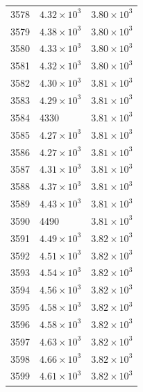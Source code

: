 \begin{table}[H]
\begin{tabular}{lll}
3578 & $\displaystyle 4.32 \times 10^{3}$ & $\displaystyle 3.80 \times 10^{3}$ \\
3579 & $\displaystyle 4.38 \times 10^{3}$ & $\displaystyle 3.80 \times 10^{3}$ \\
3580 & $\displaystyle 4.33 \times 10^{3}$ & $\displaystyle 3.80 \times 10^{3}$ \\
3581 & $\displaystyle 4.32 \times 10^{3}$ & $\displaystyle 3.80 \times 10^{3}$ \\
3582 & $\displaystyle 4.30 \times 10^{3}$ & $\displaystyle 3.81 \times 10^{3}$ \\
3583 & $\displaystyle 4.29 \times 10^{3}$ & $\displaystyle 3.81 \times 10^{3}$ \\
3584 & 4330 & $\displaystyle 3.81 \times 10^{3}$ \\
3585 & $\displaystyle 4.27 \times 10^{3}$ & $\displaystyle 3.81 \times 10^{3}$ \\
3586 & $\displaystyle 4.27 \times 10^{3}$ & $\displaystyle 3.81 \times 10^{3}$ \\
3587 & $\displaystyle 4.31 \times 10^{3}$ & $\displaystyle 3.81 \times 10^{3}$ \\
3588 & $\displaystyle 4.37 \times 10^{3}$ & $\displaystyle 3.81 \times 10^{3}$ \\
3589 & $\displaystyle 4.43 \times 10^{3}$ & $\displaystyle 3.81 \times 10^{3}$ \\
3590 & 4490 & $\displaystyle 3.81 \times 10^{3}$ \\
3591 & $\displaystyle 4.49 \times 10^{3}$ & $\displaystyle 3.82 \times 10^{3}$ \\
3592 & $\displaystyle 4.51 \times 10^{3}$ & $\displaystyle 3.82 \times 10^{3}$ \\
3593 & $\displaystyle 4.54 \times 10^{3}$ & $\displaystyle 3.82 \times 10^{3}$ \\
3594 & $\displaystyle 4.56 \times 10^{3}$ & $\displaystyle 3.82 \times 10^{3}$ \\
3595 & $\displaystyle 4.58 \times 10^{3}$ & $\displaystyle 3.82 \times 10^{3}$ \\
3596 & $\displaystyle 4.58 \times 10^{3}$ & $\displaystyle 3.82 \times 10^{3}$ \\
3597 & $\displaystyle 4.63 \times 10^{3}$ & $\displaystyle 3.82 \times 10^{3}$ \\
3598 & $\displaystyle 4.66 \times 10^{3}$ & $\displaystyle 3.82 \times 10^{3}$ \\
3599 & $\displaystyle 4.61 \times 10^{3}$ & $\displaystyle 3.82 \times 10^{3}$ \\

\end{tabular}
\end{table}

